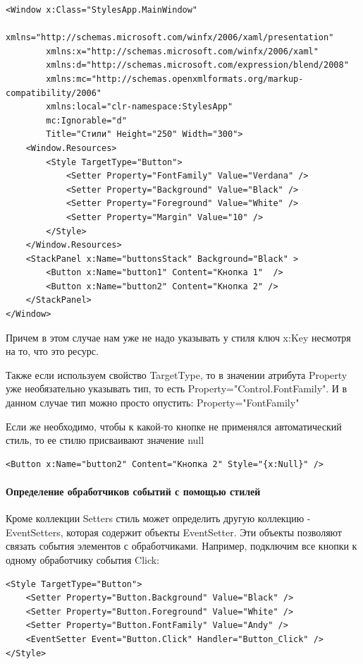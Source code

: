 \begin{verbatim}
<Window x:Class="StylesApp.MainWindow"
        xmlns="http://schemas.microsoft.com/winfx/2006/xaml/presentation"
        xmlns:x="http://schemas.microsoft.com/winfx/2006/xaml"
        xmlns:d="http://schemas.microsoft.com/expression/blend/2008"
        xmlns:mc="http://schemas.openxmlformats.org/markup-compatibility/2006"
        xmlns:local="clr-namespace:StylesApp"
        mc:Ignorable="d"
        Title="Стили" Height="250" Width="300">
    <Window.Resources>
        <Style TargetType="Button">
            <Setter Property="FontFamily" Value="Verdana" />
            <Setter Property="Background" Value="Black" />
            <Setter Property="Foreground" Value="White" />
            <Setter Property="Margin" Value="10" />
        </Style>
    </Window.Resources>
    <StackPanel x:Name="buttonsStack" Background="Black" >
        <Button x:Name="button1" Content="Кнопка 1"  />
        <Button x:Name="button2" Content="Кнопка 2" />
    </StackPanel>
</Window>
\end{verbatim}


Причем в этом случае нам уже не надо указывать у стиля ключ x:Key несмотря на то, что это ресурс.

Также если используем свойство TargetType, то в значении атрибута Property уже необязательно указывать тип, то есть Property="Control.FontFamily". И в данном случае тип можно просто опустить: Property="FontFamily"

Если же необходимо, чтобы к какой-то кнопке не применялся автоматический стиль, то ее стилю присваивают значение null

\begin{verbatim}
<Button x:Name="button2" Content="Кнопка 2" Style="{x:Null}" />
\end{verbatim}

\paragraph{Определение обработчиков событий с помощью стилей}
Кроме коллекции Setters стиль может определить другую коллекцию - EventSetters, которая содержит объекты EventSetter. Эти объекты позволяют связать события элементов с обработчиками. Например, подключим все кнопки к одному обработчику события Click:

\begin{verbatim}
<Style TargetType="Button">
    <Setter Property="Button.Background" Value="Black" />
    <Setter Property="Button.Foreground" Value="White" />
    <Setter Property="Button.FontFamily" Value="Andy" />
    <EventSetter Event="Button.Click" Handler="Button_Click" />
</Style>
\end{verbatim}


